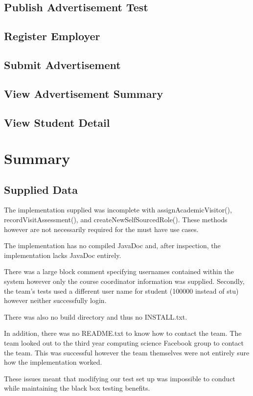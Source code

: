 \documentclass[11pt]{l3deliverable}
\begin{document}
\subsection{Publish Advertisement Test}

\newpage

\subsection{Register Employer}

\newpage

\subsection{Submit Advertisement}

\newpage

\subsection{View Advertisement Summary}

\newpage

\subsection{View Student Detail}

\newpage

\section{Summary}

\subsection{Supplied Data}

The implementation supplied was incomplete with assignAcademicVisitor(),
recordVisitAssessment(), and createNewSelfSourcedRole(). These methods however
are not necessarily required for the must have use cases.

The implementation has no compiled JavaDoc and, after inspection, the
implementation lacks JavaDoc entirely.

There was a large block comment specifying usernames contained within the
system however only the course coordinator information was supplied. Secondly,
the team's tests used a different user name for student (100000 instead of
stu) however neither successfully login.

There was also no build directory and thus no INSTALL.txt.

In addition, there was no README.txt to know how to contact the team. The
team looked out to the third year computing science Facebook group to contact
the team. This was successful however the team themselves were not entirely
sure how the implementation worked.

These issues meant that modifying our test set up was impossible to conduct
while maintaining the black box testing benefits.
\end{document}
